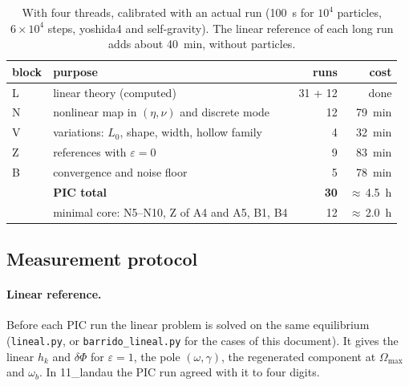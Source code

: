 \documentclass[11pt,a4paper]{article}
\begin{document}
\begin{table}[!htbp]
\centering
\begin{tabular}{llrr}
\toprule
block & purpose & runs & cost\\
\midrule
L & linear theory (computed) & 31 + 12 & done\\
N & nonlinear map in $(\eta,\nu)$ and discrete mode & 12 & \SI{79}{min}\\
V & variations: $L_0$, shape, width, hollow family & 4 & \SI{32}{min}\\
Z & references with $\varepsilon=0$ & 9 & \SI{83}{min}\\
B & convergence and noise floor & 5 & \SI{78}{min}\\
\midrule
 & \textbf{PIC total} & \textbf{30} & $\approx$\,\SI{4.5}{h}\\
 & minimal core: N5--N10, Z of A4 and A5, B1, B4 & 12 & $\approx$\,\SI{2.0}{h}\\
\bottomrule
\end{tabular}
\caption{With four threads, calibrated with an actual run (\SI{100}{s} for $10^4$ particles,
$6\times10^4$ steps, yoshida4 and self-gravity). The linear reference of each long run adds
about \SI{40}{min}, without particles.}
\label{tab:costo}
\end{table}

\subsection{Measurement protocol}
\label{sec:protocolo}

\paragraph{Linear reference.} Before each PIC run the linear problem is solved on the
same equilibrium (\texttt{lineal.py}, or \texttt{barrido\_\allowbreak lineal.py} for the cases of
this document). It gives the linear $h_k$ and $\delta\Phi$ for $\varepsilon=1$, the pole
$(\omega,\gamma)$, the regenerated component at $\Omega_{\max}$ and $\omega_b$. In 11\_landau the PIC run
agreed with it to four digits.
\end{document}
